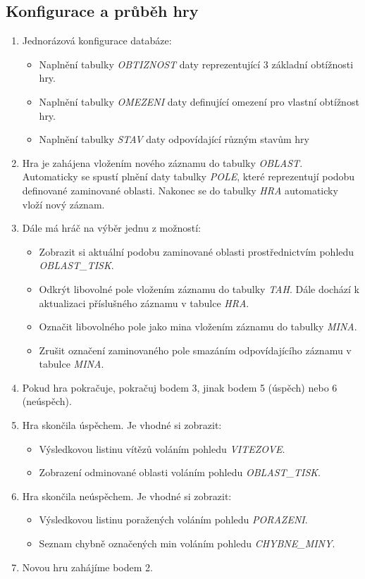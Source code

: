 \documentclass{article}
\begin{document}
\subsection{Konfigurace a průběh hry}
\begin{enumerate}
    \item Jednorázová konfigurace databáze:
    \begin{itemize}
        \item Naplnění tabulky \textit{OBTIZNOST} daty reprezentující 3 základní obtížnosti hry.
        \item Naplnění tabulky \textit{OMEZENI} daty definující omezení pro vlastní obtížnost hry.
        \item Naplnění tabulky \textit{STAV} daty odpovídající různým stavům hry
    \end{itemize}
    \item Hra je zahájena vložením nového záznamu do tabulky \textit{OBLAST}. Automaticky se spustí
        plnění daty tabulky \textit{POLE}, které reprezentují podobu definované zaminované oblasti.
        Nakonec se do tabulky \textit{HRA} automaticky vloží nový záznam.
    \item Dále má hráč na výběr jednu z možností:
    \begin{itemize}
        \item Zobrazit si aktuální podobu zaminované oblasti prostřednictvím pohledu
        \textit{OBLAST\_TISK}.
        \item Odkrýt libovolné pole vložením záznamu do tabulky \textit{TAH}. Dále dochází
            k aktualizaci příslušného záznamu v tabulce \textit{HRA}.
        \item Označit libovolného pole jako mina vložením záznamu do tabulky \textit{MINA}.
        \item Zrušit označení zaminovaného pole smazáním odpovídajícího záznamu
            v tabulce \textit{MINA}.
    \end{itemize}
    \item Pokud hra pokračuje, pokračuj bodem 3, jinak bodem 5 (úspěch) nebo 6 (neúspěch).
    \item Hra skončila úspěchem. Je vhodné si zobrazit:
        \begin{itemize}
            \item Výsledkovou listinu vítězů voláním pohledu \textit{VITEZOVE}.
            \item Zobrazení odminované oblasti voláním pohledu \textit{OBLAST\_TISK}.
        \end{itemize}
    \item Hra skončila neúspěchem. Je vhodné si zobrazit:
        \begin{itemize}
            \item Výsledkovou listinu poražených voláním pohledu \textit{PORAZENI}.
            \item Seznam chybně označených min voláním pohledu \textit{CHYBNE\_MINY}.
        \end{itemize}
    \item Novou hru zahájíme bodem 2.
        
\end{enumerate}
\end{document}
